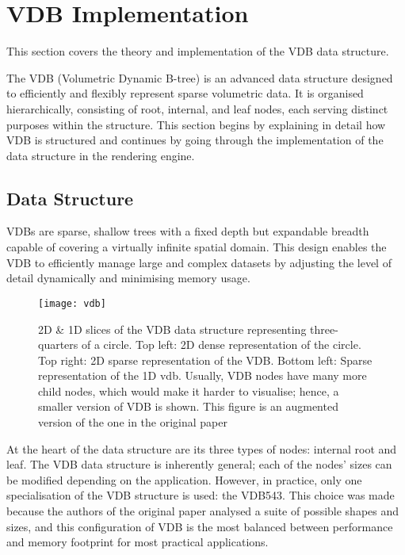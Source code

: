 \section{VDB Implementation}\label{vdb:sec}

This section covers the theory and implementation of the VDB data structure.

The VDB (Volumetric Dynamic B-tree) is an advanced data structure designed to efficiently and flexibly represent sparse volumetric data. It is organised hierarchically, consisting of root, internal, and leaf nodes, each serving distinct purposes within the structure. This section begins by explaining in detail how VDB is structured and continues by going through the implementation of the data structure in the rendering engine.

\subsection{Data Structure}
\label{vdb:ds}

VDBs are sparse, shallow trees with a fixed depth but expandable breadth capable of covering a virtually infinite spatial domain. This design enables the VDB to efficiently manage large and complex datasets by adjusting the level of detail dynamically and minimising memory usage.

\begin{figure}[H]
  \centering
  \texttt{[image: vdb]}
  \caption{2D \& 1D slices of the VDB data structure representing three-quarters of a circle. Top left: 2D dense representation of the circle. Top right: 2D sparse representation of the VDB. Bottom left: Sparse representation of the 1D vdb. Usually, VDB nodes have many more child nodes, which would make it harder to visualise; hence, a smaller version of VDB is shown. This figure is an augmented version of the one in the original paper\supercite{vdb2013}}
\end{figure}

At the heart of the data structure are its three types of nodes: internal root and leaf. The VDB data structure is inherently general; each of the nodes' sizes can be modified depending on the application. However, in practice, only one specialisation of the VDB structure is used: the VDB543. This choice was made because the authors of the original paper\supercite{vdb2013} analysed a suite of possible shapes and sizes, and this configuration of VDB is the most balanced between performance and memory footprint for most practical applications.

